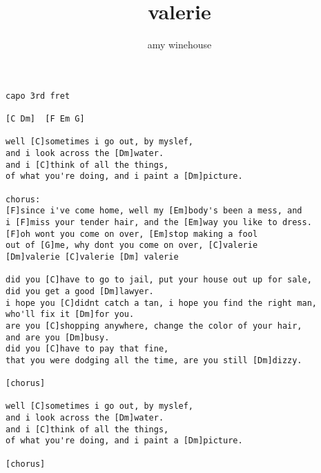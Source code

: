 \author{amy winehouse}
\title{valerie}
\maketitle
\begin{verbatim}
capo 3rd fret

[C Dm]  [F Em G]

well [C]sometimes i go out, by myslef,
and i look across the [Dm]water.
and i [C]think of all the things,
of what you're doing, and i paint a [Dm]picture.

chorus:
[F]since i've come home, well my [Em]body's been a mess, and
i [F]miss your tender hair, and the [Em]way you like to dress.
[F]oh wont you come on over, [Em]stop making a fool
out of [G]me, why dont you come on over, [C]valerie
[Dm]valerie [C]valerie [Dm] valerie

did you [C]have to go to jail, put your house out up for sale,
did you get a good [Dm]lawyer.
i hope you [C]didnt catch a tan, i hope you find the right man,
who'll fix it [Dm]for you.
are you [C]shopping anywhere, change the color of your hair,
and are you [Dm]busy.
did you [C]have to pay that fine,
that you were dodging all the time, are you still [Dm]dizzy.

[chorus]

well [C]sometimes i go out, by myslef,
and i look across the [Dm]water.
and i [C]think of all the things,
of what you're doing, and i paint a [Dm]picture.

[chorus]
\end{verbatim}